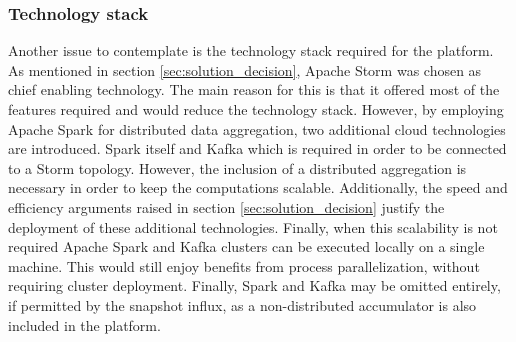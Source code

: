 \subsubsection*{Technology stack}
Another issue to contemplate is the technology stack required for the platform. As mentioned in section \ref{sec:solution_decision}, Apache Storm was chosen as chief enabling technology. The main reason for this is that it offered most of the features required and would reduce the technology stack. However, by employing Apache Spark for distributed data aggregation, two additional cloud technologies are introduced. Spark itself and Kafka which is required in order to be connected to a Storm topology. However, the inclusion of a distributed aggregation is necessary in order to keep the computations scalable. Additionally, the speed and efficiency arguments raised in section \ref{sec:solution_decision} justify the deployment of these additional technologies. Finally, when this scalability is not required Apache Spark and Kafka clusters can be executed locally on a single machine. This would still enjoy benefits from process parallelization, without requiring cluster deployment. Finally, Spark and Kafka may be omitted entirely, if permitted by the snapshot influx, as a non-distributed accumulator is also included in the platform.




	
